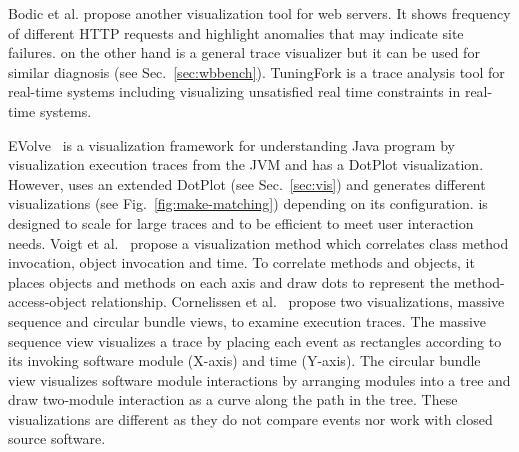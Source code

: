 Bodic et al. \cite{bodik2005combining} propose another visualization tool for
web servers.
It shows frequency of different HTTP requests
and highlight anomalies that may indicate site failures.
\VDP{} on the other hand is a general trace visualizer but
it can be used for similar diagnosis (see Sec.~\ref{sec:wbbench}).
TuningFork \cite{bacon2007tuningfork} is a trace analysis tool for real-time systems
including visualizing unsatisfied real time constraints in
real-time systems.

EVolve~\cite{wang2003evolve} is a visualization framework for understanding
Java program by visualization execution traces from the JVM and
has a DotPlot visualization.
However, \VDP{} uses an extended DotPlot (see Sec.~\ref{sec:vis})
and generates different visualizations (see Fig.~\ref{fig:make-matching})
depending on its configuration.
\lviz{} is designed to scale for large traces and
to be efficient to meet user interaction needs.
Voigt et al.~\cite{voigt2009object} propose a visualization method which correlates
class method invocation, object invocation and time.
To correlate methods and objects, it places objects and methods
on each axis and draw dots to represent the
method-access-object relationship.
Cornelissen et al.~\cite{cornelissen2007understanding} propose two visualizations,
massive sequence and circular bundle views, to examine execution traces.
The massive sequence view visualizes a trace by placing each event as rectangles
according to its invoking software module (X-axis) and time (Y-axis).
The circular bundle view visualizes software module interactions by arranging
modules into a tree and draw two-module interaction as a curve along the
path in the tree.
These visualizations are different as they do not compare events 
nor work with closed source software.

